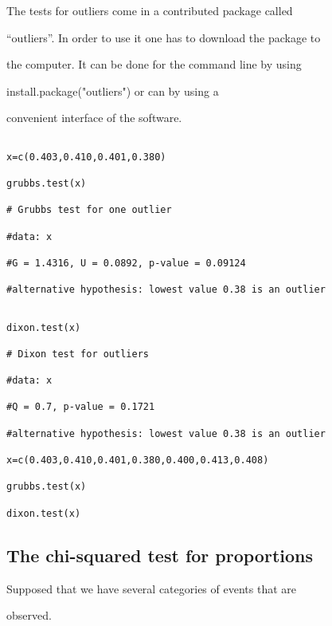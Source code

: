 The tests for outliers come in a contributed package called

“outliers”. In order to use it one has to download the package to

the computer. It can be done for the command line by using

install.package("outliers") or can by using a

convenient interface of the software.

\begin{verbatim}

x=c(0.403,0.410,0.401,0.380)

grubbs.test(x)

# Grubbs test for one outlier

#data: x

#G = 1.4316, U = 0.0892, p-value = 0.09124

#alternative hypothesis: lowest value 0.38 is an outlier

\end{verbatim}

 



\begin{verbatim}

dixon.test(x)

# Dixon test for outliers

#data: x

#Q = 0.7, p-value = 0.1721

#alternative hypothesis: lowest value 0.38 is an outlier

x=c(0.403,0.410,0.401,0.380,0.400,0.413,0.408)

grubbs.test(x)

dixon.test(x)

\end{verbatim}



 

\subsection{The chi-squared test for proportions}

 

Supposed that we have several categories of events that are

observed.

